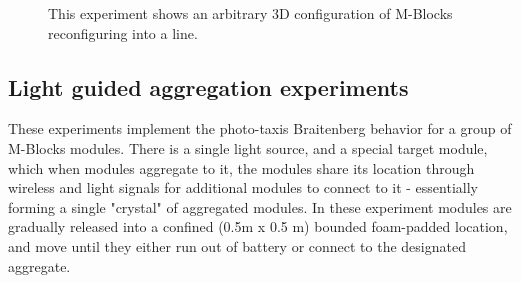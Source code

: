 \begin{figure}[h]
\begin{subfigure}[b]{0.32\linewidth}
	\end{subfigure}
	
	\caption{This experiment shows an arbitrary 3D configuration of M-Blocks reconfiguring into a line.}
	
	\label{fig:lineExperiment}
\end{figure}

\subsection{Light guided aggregation experiments}
\label{sec:mblocksExperimentsLight}


These experiments implement the photo-taxis Braitenberg behavior for a group of M-Blocks modules. There is a single light source, and a special target module, which when modules aggregate to it, the modules share its location through wireless and light signals for additional modules to connect to it - essentially forming a single "crystal" of aggregated modules. In these experiment modules are gradually released into a confined (0.5m x 0.5 m) bounded foam-padded location, and move until they either run out of battery or connect to the designated aggregate.

